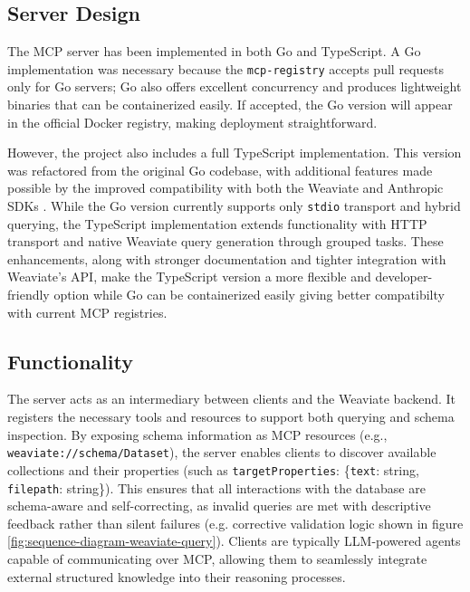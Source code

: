 \subsection{Server Design}

The MCP server has been implemented in both Go and TypeScript. A Go implementation was necessary because the \texttt{mcp-registry} accepts pull requests only for Go servers; Go also offers excellent concurrency and produces lightweight binaries that can be containerized easily. If accepted, the Go version will appear in the official Docker registry, making deployment straightforward.

However, the project also includes a full TypeScript implementation. This version was refactored from the original Go codebase, with additional features made possible by the improved compatibility with both the Weaviate and Anthropic SDKs \cite{stainless_mcp_comparison}. While the Go version currently supports only \texttt{stdio} transport and hybrid querying, the TypeScript implementation extends functionality with HTTP transport and native Weaviate query generation through grouped tasks. These enhancements, along with stronger documentation and tighter integration with Weaviate’s API, make the TypeScript version a more flexible and developer-friendly option while Go can be containerized easily giving better compatibilty with current \gls{MCP} registries.
\subsection{Functionality}
The server acts as an intermediary between clients and the Weaviate backend. It registers the necessary tools and resources to support both querying and schema inspection. By exposing schema information as MCP resources (e.g., \texttt{weaviate://schema/Dataset}), the server enables clients to discover available collections and their properties (such as \texttt{targetProperties}: \{\texttt{text}: string, \texttt{filepath}: string\}). This ensures that all interactions with the database are schema-aware and self-correcting, as invalid queries are met with descriptive feedback rather than silent failures (e.g. corrective validation logic shown in figure \ref{fig:sequence-diagram-weaviate-query}). Clients are typically \gls{LLM}-powered agents capable of communicating over \gls{MCP}, allowing them to seamlessly integrate external structured knowledge into their reasoning processes.


